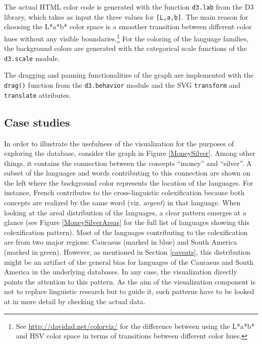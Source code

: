 The actual HTML color code is generated with the function \texttt{d3.lab} from the D3 library, which takes as input the three values for \texttt{[L,a,b]}. The main reason for choosing the L*a*b* color space is a smoother transition between different color hues without any visible boundaries.\footnote{See \url{http://davidad.net/colorviz/} for the difference between using the L*a*b* and HSV color space in terms of transitions between different color hues.} For the coloring of the language families, the background colors are generated with the categorical scale functions of the \texttt{d3.scale} module. 


The  dragging and panning functionalities of the graph are implemented with the \texttt{drag()} function from the \texttt{d3.behavior} module and the SVG \texttt{transform} and \texttt{translate} attributes. 

\subsection{Case studies} \label{case study}

In order to illustrate the usefulness of the visualization for the purposes of exploring the database, consider the graph in Figure \ref{MoneySilver}. Among other things, it contains the connection between the concepts ``money'' and ``silver''. A subset of the languages and words contributing to this connection are shown on the left where the background color represents the location of the languages. For instance, French contributes to the cross-linguistic colexification because both concepts are realized by the same word (viz. \textit{argent}) in that language. When looking at the areal distribution of the languages, a clear pattern emerges at a glance (see Figure \ref{MoneySilverAreas} for the full list of languages showing this colexification pattern). Most of the languages contributing to the colexification are from two major regions: Caucasus (marked in blue) and South America (marked in green). However, as mentioned in Section \ref{caveats}, this distribution might be an artifact of the general bias for languages of the Caucasus and South America in the underlying databases. In any case, the visualization directly points the attention to this pattern. As the  aim of the visualization component is not to replace linguistic research but to guide it, such patterns have to be looked at in more detail by checking the actual data. 

